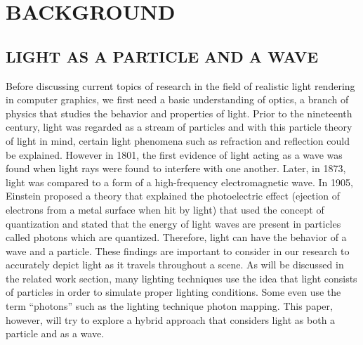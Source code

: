 \chapter{BACKGROUND}

\section{LIGHT AS A PARTICLE AND A WAVE}
Before discussing current topics of research in the field of realistic light rendering in computer graphics, we first need a basic understanding of optics, a branch of physics that studies the behavior and properties of light.  Prior to the nineteenth century, light was regarded as a stream of particles and with this particle theory of light in mind, certain light phenomena such as refraction and reflection could be explained.  However in 1801, the first evidence of light acting as a wave was found when light rays were found to interfere with one another.  Later, in 1873, light was compared to a form of a high-frequency electromagnetic wave.  In 1905, Einstein proposed a theory that explained the photoelectric effect (ejection of electrons from a metal surface when hit by light) that used the concept of quantization and stated that the energy of light waves are present in particles called photons which are quantized.  \cite{Serway2004}  Therefore, light can have the behavior of a wave and a particle.  These findings are important to consider in our research to accurately depict light as it travels throughout a scene.  As will be discussed in the related work section, many lighting techniques use the idea that light consists of particles in order to simulate proper lighting conditions.  Some even use the term “photons” such as the lighting technique photon mapping.  This paper, however, will try to explore a hybrid approach that considers light as both a particle and as a wave.


